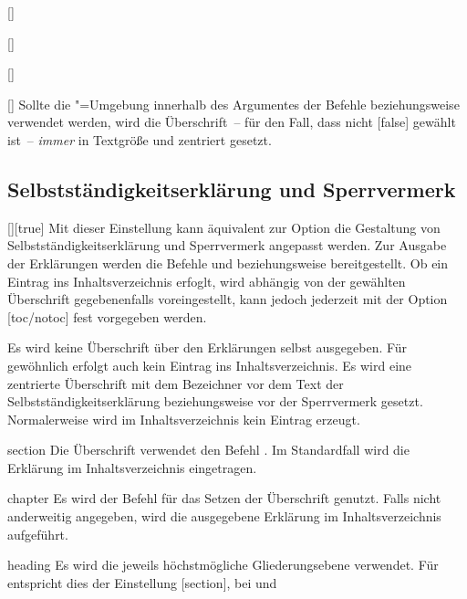 \documentclass[%
  english,ngerman,%
  headings=optiontoheadandtoc,captions=tableheading,numbers=noenddot,%
  chapterpage,cdfoot,%
]{tudscrman}
\begin{document}
\begin{Declaration}{[]}
\begin{Declaration}{[]}
\begin{Declaration}{[]}
\begin{Declaration}{[\PSet]}
Sollte die "=Umgebung innerhalb des Argumentes der Befehle 
 beziehungsweise  verwendet werden, 
wird die Überschrift~-- für den Fall, dass nicht [false] 
gewählt ist~-- \emph{immer} in Textgröße und zentriert gesetzt.
\end{Declaration}
\end{Declaration}
\end{Declaration}
\end{Declaration}
%

\subsection{Selbstständigkeitserklärung und Sperrvermerk}
\begin{Declaration}{[\PSet]}[true]%
\printdeclarationlist%
%
%
Mit dieser Einstellung kann äquivalent zur Option  die 
Gestaltung von Selbstständigkeitserklärung und Sperrvermerk angepasst werden.
Zur Ausgabe der Erklärungen werden die Befehle  und 
 beziehungsweise  bereitgestellt. Ob ein 
Eintrag ins Inhaltsverzeichnis erfoglt, wird abhängig von der gewählten 
Überschrift gegebenenfalls voreingestellt, kann jedoch jederzeit mit der Option 
[toc/notoc] fest vorgegeben werden.
%
\begin{values}
\itemfalse
  Es wird keine Überschrift über den Erklärungen selbst ausgegeben. Für 
  gewöhnlich erfolgt auch kein Eintrag ins Inhaltsverzeichnis.
\itemtrue*
  Es wird eine zentrierte Überschrift mit dem Bezeichner  
  vor dem Text der Selbstständigkeitserklärung beziehungsweise 
   vor  der Sperrvermerk gesetzt. Normalerweise
  wird im Inhaltsverzeichnis kein Eintrag erzeugt.
\item[section] Die Überschrift verwendet den Befehl . Im 
  Standardfall wird die Erklärung im Inhaltsverzeichnis eingetragen.
\item[chapter]
  Es wird der Befehl  für das Setzen der Überschrift genutzt. 
  Falls nicht anderweitig angegeben, wird die ausgegebene Erklärung im 
  Inhaltsverzeichnis aufgeführt.
\item[heading] Es wird die jeweils höchstmögliche Gliederungsebene verwendet.
  Für  entspricht dies der Einstellung 
  [section], bei  und  

\end{values}
\end{Declaration}
\end{document}
